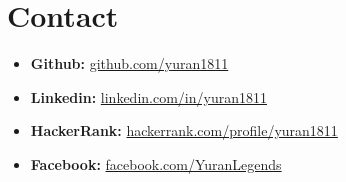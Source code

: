\documentclass[letterpaper,11pt]{article}
\begin{document}
\section{Contact}
\begin{itemize}[leftmargin=*]\small
	\item \textbf{Github:} \href{https://github.com/yuran1811}{github.com/yuran1811}\vspace{-5pt}
	\item \textbf{Linkedin:} \href{https://www.linkedin.com/in/yuran1811}{linkedin.com/in/yuran1811}\vspace{-5pt}
	\item \textbf{HackerRank:} \href{https://www.hackerrank.com/profile/yuran1811}{hackerrank.com/profile/yuran1811}\vspace{-5pt}
	\item \textbf{Facebook:} \href{https://www.facebook.com/YuranLegends}{facebook.com/YuranLegends}\vspace{-5pt}
\end{itemize}
\end{document}
